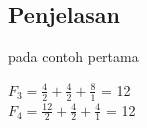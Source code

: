 \documentclass{article}
\begin{document}
\subsection*{Penjelasan}
pada contoh pertama 

\(F_3   = \frac{4}{2} + \frac{4}{2} + \frac{8}{1}\) = 12\\ 

\(F_4   = \frac{12}{2} + \frac{4}{2} + \frac{4}{1}\) = 12\\


\pagebreak
\end{document}
